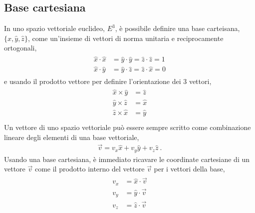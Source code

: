\documentclass[letterpaper,10pt,english]{jupyterBook}
\begin{document}
\subsection{Base cartesiana}
\label{\detokenize{ch/algebra/vector-algebra-euclidean-space:base-cartesiana}}
\sphinxAtStartPar
In uno spazio vettoriale euclideo, \(E^3\), è possibile definire una base carteisana, \(\{ \hat{x}, \hat{y}, \hat{z} \}\), come un’insieme di vettori di norma unitaria e reciprocamente ortogonali,
\begin{equation*}
\begin{split}\begin{aligned}
  \hat{x} \cdot  \hat{x} & = \hat{y} \cdot  \hat{y} = \hat{z} \cdot  \hat{z} = 1 \\
  \hat{x} \cdot  \hat{y} & = \hat{y} \cdot  \hat{z} = \hat{z} \cdot  \hat{x} = 0
\end{aligned}\end{split}
\end{equation*}
\sphinxAtStartPar
e usando il prodotto vettore per definire l’orientazione dei 3 vettori,
\begin{equation*}
\begin{split}\begin{aligned}
  \hat{x} \times \hat{y} & = \hat{z} \\
  \hat{y} \times \hat{z} & = \hat{x} \\
  \hat{z} \times \hat{x} & = \hat{y} \\
\end{aligned}\end{split}
\end{equation*}
\sphinxAtStartPar
Un vettore di uno spazio vettoriale può essere sempre scritto come combinazione lineare degli elementi di una base vettoriale,
\begin{equation*}
\begin{split}\vec{v} = v_x \hat{x} + v_y \hat{y} + v_z \hat{z} \ .\end{split}
\end{equation*}
\sphinxAtStartPar
Usando una base cartesiana, è immediato ricavare le coordinate cartesiane di un vettore \(\vec{v}\) come il prodotto interno del vettore \(\vec{v}\) per i vettori della base,
\begin{equation*}
\begin{split}\begin{aligned}
  v_x & = \hat{x} \cdot \vec{v} \\
  v_y & = \hat{y} \cdot \vec{v} \\
  v_z & = \hat{z} \cdot \vec{v} \\
\end{aligned}\end{split}
\end{equation*}
\end{document}
